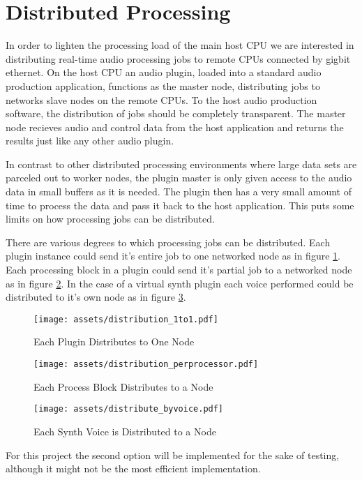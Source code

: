 \section{Distributed Processing}

In order to lighten the processing load of the main host CPU we are interested in distributing real-time audio processing jobs to remote CPUs connected by gigbit ethernet. On the host CPU an audio plugin, loaded into a standard audio production application, functions as the master node, distributing jobs to networks slave nodes on the remote CPUs. To the host audio production software, the distribution of jobs should be completely transparent. The master node recieves audio and control data from the host application and returns the results just like any other audio plugin.

In contrast to other distributed processing environments where large data sets are parceled out to worker nodes, the plugin master is only given access to the audio data in small buffers as it is needed. The plugin then has a very small amount of time to process the data and pass it back to the host application. This puts some limits on how processing jobs can be distributed.

There are various degrees to which processing jobs can be distributed. Each plugin instance could send it's entire
job to one networked node as in figure \ref{fig:one_to_one}. Each processing block in a plugin could send it's
partial job to a networked node as in figure \ref{fig:perproccessor}. In the case of a virtual synth plugin each
voice performed could be distributed to it's own node as in figure \ref{fig:pervoice}.

\begin{figure}[H]
    \centering
    \texttt{[image: assets/distribution\_1to1.pdf]}
    \caption{Each Plugin Distributes to One Node}
    \label{fig:one_to_one}
\end{figure}

\begin{figure}[H]
    \centering
    \texttt{[image: assets/distribution\_perprocessor.pdf]}
    \caption{Each Process Block Distributes to a Node}
    \label{fig:perproccessor}
\end{figure}

\begin{figure}[H]
    \centering
    \texttt{[image: assets/distribute\_byvoice.pdf]}
    \caption{Each Synth Voice is Distributed to a Node}
    \label{fig:pervoice}
\end{figure}

For this project the second option will be implemented for the sake of testing, although it might not be the most efficient implementation.